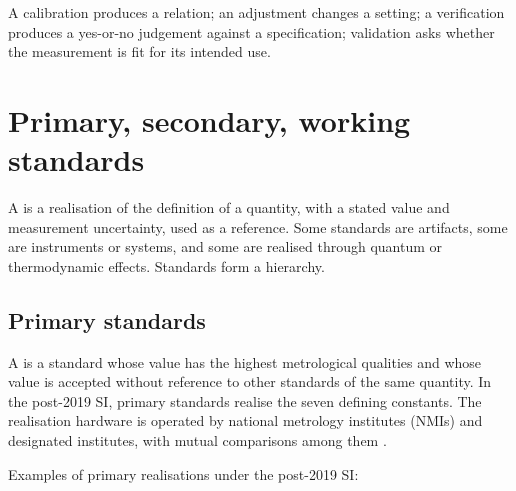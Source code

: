 A calibration produces a relation; an adjustment changes a setting;
a verification produces a yes-or-no judgement against a
specification; validation asks whether the measurement is fit for
its intended use.



\section{Primary, secondary, working standards}

A  is a realisation of the definition
of a quantity, with a stated value and measurement uncertainty, used
as a reference. Some standards are artifacts, some are instruments
or systems, and some are realised through quantum or thermodynamic
effects. Standards form a hierarchy.



\subsection{Primary standards}

A  is a standard whose value has the
highest metrological qualities and whose value is accepted without
reference to other standards of the same quantity. In the post-2019
SI, primary standards realise the seven defining constants. The
realisation hardware is operated by national metrology institutes
(NMIs) and designated institutes, with mutual comparisons among them
\cite{std:bipm-si2019, std:bipm-cipm-mra}.

Examples of primary realisations under the post-2019 SI:

